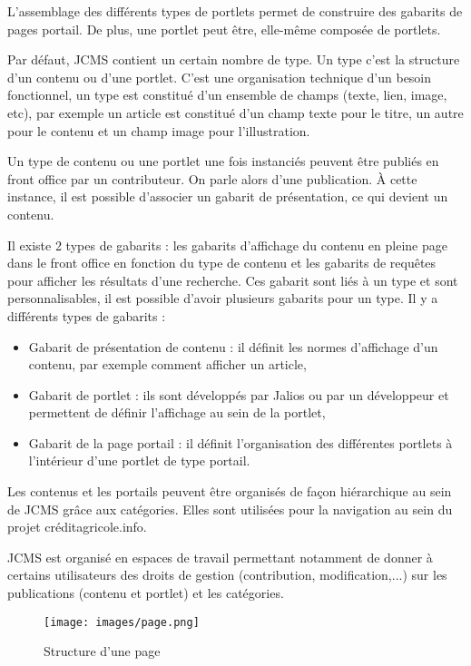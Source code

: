 \documentclass[12pt,a4paper]{article}
\begin{document}
L'assemblage des différents types de portlets permet de construire des gabarits de pages portail. De plus, une portlet peut être, elle-même composée de portlets.\par 
Par défaut, \gls{JCMS} contient un certain nombre de type. Un type c'est la structure d'un contenu ou d'une portlet. C'est une organisation technique d'un besoin fonctionnel, un type est constitué d'un ensemble de champs (texte, lien, image, etc), par exemple un article est constitué d'un champ texte pour le titre, un autre pour le contenu et un champ image pour l'illustration.\par 
Un type de contenu ou une portlet une fois instanciés peuvent être publiés en front office par un contributeur. On parle alors d'une publication. À cette instance, il est possible d'associer un gabarit de présentation, ce qui devient un contenu.\par
Il existe 2 types de gabarits : les gabarits d'affichage du contenu en pleine page dans le front office en fonction du type de contenu et les gabarits de requêtes pour afficher les résultats d'une recherche. Ces gabarit sont liés à un type et sont personnalisables, il est possible d'avoir plusieurs gabarits pour un type. Il y a différents types de gabarits :
\begin{itemize}
\item Gabarit de présentation de contenu : il définit les normes d'affichage d'un contenu, par exemple comment afficher un article,
\item Gabarit de portlet : ils sont développés par Jalios ou par un développeur et permettent de définir l'affichage au sein de la portlet,
\item Gabarit de la page portail : il définit l'organisation des différentes portlets à l'intérieur d'une portlet de type portail.
\end{itemize}\par 
Les contenus et les portails peuvent être organisés de façon hiérarchique au sein de \gls{JCMS} grâce aux catégories. Elles sont utilisées pour la navigation au sein du projet créditagricole.info.\par
\gls{JCMS} est organisé en espaces de travail permettant notamment de donner à certains utilisateurs des droits de gestion (contribution, modification,...) sur les publications (contenu et portlet) et les catégories.\par 
\begin{figure}[h!]
\centering
\texttt{[image: images/page.png]}
\caption{Structure d'une page}
\end{figure}
\end{document}
